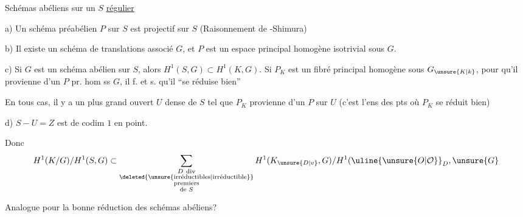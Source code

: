 Schémas abéliens sur un $S$ \uline{régulier}

a) Un schéma préabélien $P$ sur $S$ est projectif sur $S$
(Raisonnement de -Shimura)

b) Il existe un schéma de translations associé $G$,
et $P$ est un espace  principal homogène
 isotrivial sous $G$.

c) Si $G$ est un schéma abélien sur $S$, alors
$H^1(S,G)\subset H^1(K,G)$. Si $P_K$ est un
fibré principal homogène sous $G_{\unsure{K|k}}$, pour
qu'il  provienne d'un $P$ pr. hom
ss $G$, il f. et s. qu'il ``se réduise bien''

 En tous cas, il y a un plus grand
 ouvert $U$  dense de $S$ tel que
$P_K$ provienne d'un $P$ sur $U$ (c'est
l'ens des pts où $P_K$  se réduit bien)

d) $S-U=Z$ est de codim $1$ en  point.

Donc
\[
H^1(K/G)/H^1(S,G)\subset
\sum_{\substack{D\ \text{div}\\\deleted{\text{\unsure{irréductibles|irréductible}}}\\\text{premiers}\\\text{de }S}}
H^1(K_{\unsure{D|v}},G)/H^1(\uline{\unsure{O|\mathcal{O}}}_D,\unsure{G}
\]

Analogue  pour la bonne
réduction des schémas abéliens?
